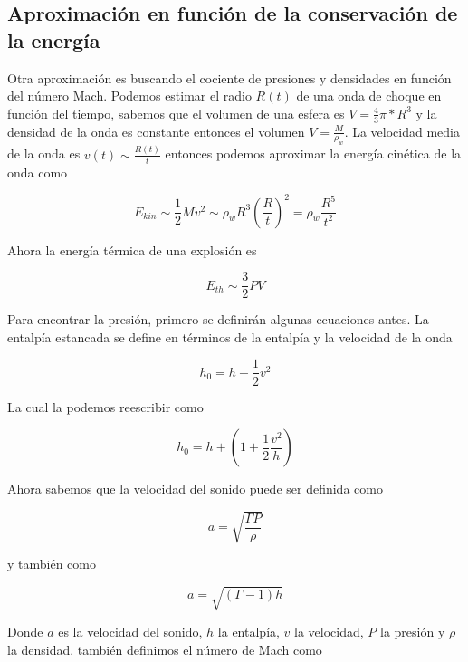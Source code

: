 \documentclass[12pt,a4paper]{book}
\begin{document}
\subsection{Aproximación en función de la conservación de la energía}

Otra aproximación es buscando el cociente de presiones y densidades en función del número Mach.
Podemos estimar el radio $R(t)$ de una onda de choque en función del tiempo, sabemos que el volumen de una esfera es $V = \frac{4}{3} \pi * R^3$ y la densidad de la onda es constante entonces el volumen $V = \frac{M}{\rho_w}$. La velocidad media de la onda es $v(t) \sim \frac{R(t)}{t} $
entonces podemos aproximar la energía cinética de la onda como 

\begin{equation}
	E_{kin} \sim \frac{1}{2} M v^2 \sim \rho_w R^3 \left( \frac{R}{t} \right) ^2 = \rho_w \frac{R^5}{t^2}
\end{equation}

Ahora la energía térmica de una explosión es 

\begin{equation} \label{eq_energia_termica}
	E_{th} \sim \frac{3}{2}PV
\end{equation}

Para encontrar la presión, primero se definirán algunas ecuaciones antes. La entalpía estancada se define en términos de la entalpía y la velocidad de la onda 

\begin{equation}
	h_0 = h + \frac{1}{2} v^2
\end{equation}

La cual la podemos reescribir como

\begin{equation} \label{eq_entalpía}
	h_0 = h + \left( 1 +\frac{1}{2} \frac{v^2}{h} \right)
\end{equation}

Ahora sabemos que la velocidad del sonido puede ser definida como 

\begin{equation} \label{eq_sonido_1}
	a = \sqrt{\frac{\Gamma P}{\rho}}
\end{equation}

y también como 

\begin{equation} \label{eq_sonido_2}
	a = \sqrt{(\Gamma-1) h}
\end{equation}

Donde $a$ es la velocidad del sonido, $h$ la entalpía, $v$ la velocidad, $P$ la presión y $\rho$ la densidad. también definimos el número de Mach como 
\end{document}
